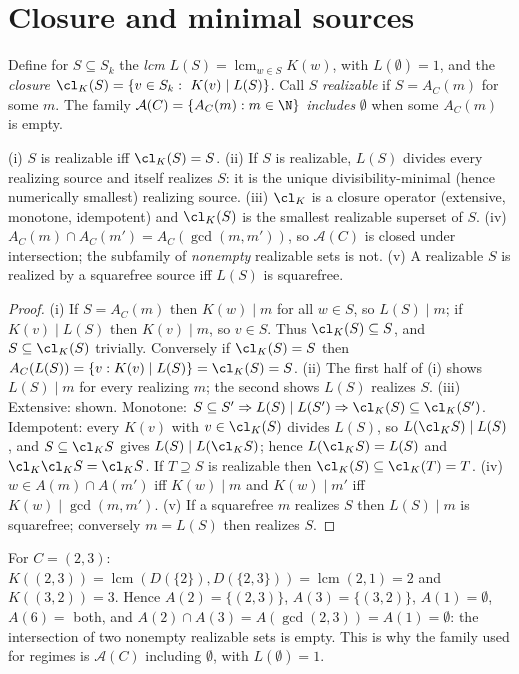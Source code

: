 \section{Closure and minimal sources}
Define for $S\subseteq S_k$ the \emph{lcm} $L(S)=\operatorname{lcm}_{w\in S}K(w)$, with $L(\emptyset)=1$, and the \emph{closure} $\cl_K(S)=\{v\in S_k:\ K(v)\mid L(S)\}$. Call $S$ \emph{realizable} if $S=A_C(m)$ for some $m$. The family $\mathcal A(C)=\{A_C(m):m\in\N\}$ \emph{includes} $\emptyset$ when some $A_C(m)$ is empty.

\begin{theorem}\label{thm:closure}
(i) $S$ is realizable iff $\cl_K(S)=S$. (ii) If $S$ is realizable, $L(S)$ divides every realizing source and itself realizes $S$: it is the unique divisibility-minimal (hence numerically smallest) realizing source. (iii) $\cl_K$ is a closure operator (extensive, monotone, idempotent) and $\cl_K(S)$ is the smallest realizable superset of $S$. (iv) $A_C(m)\cap A_C(m')=A_C(\gcd(m,m'))$, so $\mathcal A(C)$ is closed under intersection; the subfamily of \emph{nonempty} realizable sets is not. (v) A realizable $S$ is realized by a squarefree source iff $L(S)$ is squarefree.
\end{theorem}
\begin{proof}
(i) If $S=A_C(m)$ then $K(w)\mid m$ for all $w\in S$, so $L(S)\mid m$; if $K(v)\mid L(S)$ then $K(v)\mid m$, so $v\in S$. Thus $\cl_K(S)\subseteq S$, and $S\subseteq\cl_K(S)$ trivially. Conversely if $\cl_K(S)=S$ then $A_C(L(S))=\{v:K(v)\mid L(S)\}=\cl_K(S)=S$.
(ii) The first half of (i) shows $L(S)\mid m$ for every realizing $m$; the second shows $L(S)$ realizes $S$.
(iii) Extensive: shown. Monotone: $S\subseteq S'\Rightarrow L(S)\mid L(S')\Rightarrow\cl_K(S)\subseteq\cl_K(S')$. Idempotent: every $K(v)$ with $v\in\cl_K(S)$ divides $L(S)$, so $L(\cl_KS)\mid L(S)$, and $S\subseteq\cl_KS$ gives $L(S)\mid L(\cl_KS)$; hence $L(\cl_KS)=L(S)$ and $\cl_K\cl_KS=\cl_KS$. If $T\supseteq S$ is realizable then $\cl_K(S)\subseteq\cl_K(T)=T$.
(iv) $w\in A(m)\cap A(m')$ iff $K(w)\mid m$ and $K(w)\mid m'$ iff $K(w)\mid\gcd(m,m')$.
(v) If a squarefree $m$ realizes $S$ then $L(S)\mid m$ is squarefree; conversely $m=L(S)$ then realizes $S$.
\end{proof}
\begin{example}\label{ex:erratum}
For $C=(2,3)$: $K((2,3))=\operatorname{lcm}(D(\{2\}),D(\{2,3\}))=\operatorname{lcm}(2,1)=2$ and $K((3,2))=3$. Hence $A(2)=\{(2,3)\}$, $A(3)=\{(3,2)\}$, $A(1)=\emptyset$, $A(6)=$ both, and $A(2)\cap A(3)=A(\gcd(2,3))=A(1)=\emptyset$: the intersection of two nonempty realizable sets is empty. This is why the family used for regimes is $\mathcal A(C)$ including $\emptyset$, with $L(\emptyset)=1$.
\end{example}

